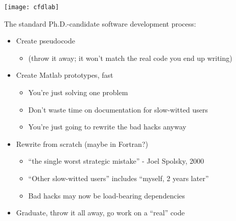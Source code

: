 \frame
{
  \begin{center}
  \texttt{[image: cfdlab]}
  \end{center}

  \begin{block}{The standard Ph.D.-candidate software development
    process:}
  \pause
  \begin{itemize}[<+->]
    \item Create pseudocode
      \begin{itemize}[<+->]
        \item (throw it away; it won't match the real code you
          end up writing)
      \end{itemize}
    \item Create Matlab prototypes, fast
      \begin{itemize}[<+->]
        \item You're just solving one problem
        \item Don't waste time on
          documentation for slow-witted users
        \item You're just going to rewrite the bad hacks
          anyway
      \end{itemize}
    \item Rewrite from scratch (maybe in Fortran?)
      \begin{itemize}[<+->]
        \item ``the single worst strategic mistake'' - Joel Spolsky, 2000
        \item ``Other slow-witted users'' includes ``myself, 2 years
          later''
        \item Bad hacks may now be load-bearing dependencies
      \end{itemize}
    \item Graduate, throw it all away, go work on a ``real'' code
  \end{itemize}  
  \end{block}


}


 

